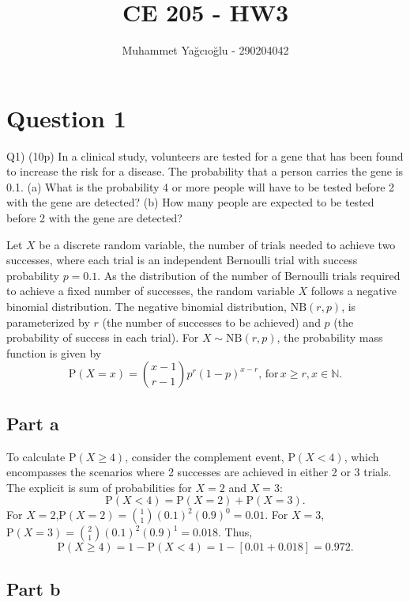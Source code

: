 \documentclass[12pt]{article}
\title{\vspace{-1cm}CE 205 - HW3}
\author{Muhammet Yağcıoğlu - 290204042}
\begin{document}
\maketitle\thispagestyle{fancy}
\pagestyle{fancy}
\tableofcontents
\newpage
\section*{Question 1}
\begin{q}
Q1) (10p) In a clinical study, volunteers are tested for a gene that has been found to increase the risk for a disease. The probability that a person carries the gene is 0.1.
(a) What is the probability 4 or more people will have to be tested before 2 with the gene are detected?
(b) How many people are expected to be tested before 2 with the gene are detected?
\end{q}

Let \( X \) be a discrete random variable, the number of trials needed to achieve two successes, where each trial is an independent Bernoulli trial with success probability \( p = 0.1 \). As the distribution of the number of Bernoulli trials required to achieve a fixed number of successes, the random variable \( X \) follows a negative binomial distribution. The negative binomial distribution, \( \text{NB}(r, p) \), is parameterized by \( r \) (the number of successes to be achieved) and \( p \) (the probability of success in each trial). For \( X \sim \text{NB}(r, p) \), the probability mass function is given by
\[ \mathrm{P}(X = x) = \binom{x-1}{r-1} p^r (1-p)^{x-r}, \, \text{for} \, x \geq r, x \in \mathbb{N}. \]

\subsection*{Part a}

To calculate \( \mathrm{P}(X \geq 4) \), consider the complement event, \( \mathrm{P}(X < 4) \), which encompasses the scenarios where 2 successes are achieved in either 2 or 3 trials. The explicit is sum of probabilities for \( X = 2 \) and \( X = 3 \):\[ \mathrm{P}(X < 4) = \mathrm{P}(X = 2) + \mathrm{P}(X = 3). \]For \( X = 2 \),\( \mathrm{P}(X = 2) = \binom{1}{1} (0.1)^2 (0.9)^{0} = 0.01. \) For \( X = 3 \),\( \mathrm{P}(X = 3) = \binom{2}{1} (0.1)^2 (0.9)^{1} = 0.018. \) Thus, \[ \mathrm{P}(X \geq 4) = 1 - \mathrm{P}(X < 4) = 1 - [0.01 + 0.018] = 0.972. \]
\AnswerTag
\subsection*{Part b}
\end{document}

